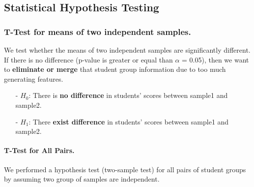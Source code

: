 \documentclass[11pt]{article}
\begin{document}
%

\subsection{Statistical Hypothesis Testing}

\subsubsection{T-Test for means of two independent samples.}

We test whether the means of two independent samples are significantly different. If there is no difference (p-value is greater or equal than $\alpha$ = 0.05), then we want to \textbf{eliminate or merge} that student group information due to too much generating features.
\begin{itemize}
\item[-] $H_{0}$: There is \textbf{no difference} in students' scores between sample1 and sample2.
\item[-] $H_{1}$: There \textbf{exist difference} in students' scores between sample1 and sample2.
\end{itemize}

\paragraph*{T-Test for All Pairs.}
We performed a hypothesis test (two-sample test) for all pairs of student groups by assuming two group of samples are independent.  
\end{document}
